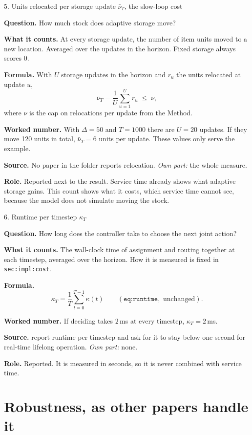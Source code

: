 \documentclass[11pt,a4paper]{article}
\newcommand{\row}[1]{\par\smallskip\noindent\textbf{#1}\enspace}
\begin{document}
\begin{card}{5. Units relocated per storage update $\bar\nu_T$, the slow-loop cost}
\row{Question.} How much stock does adaptive storage move?

\row{What it counts.} At every storage update, the number of item units
moved to a new location. Averaged over the updates in the horizon. Fixed
storage always scores $0$.

\row{Formula.} With $U$ storage updates in the horizon and $r_u$ the units
relocated at update $u$,
\[
  \bar\nu_T = \frac{1}{U}\sum_{u=1}^{U} r_u \;\le\; \nu ,
\]
where $\nu$ is the cap on relocations per update from the Method.

\row{Worked number.} With $\Delta = 50$ and $T = 1000$ there are $U = 20$
updates. If they move 120 units in total, $\bar\nu_T = 6$ units per
update. These values only serve the example.

\row{Source.} No paper in the folder reports relocation. \emph{Own part:}
the whole measure.

\row{Role.} Reported next to the result. Service time already shows what
adaptive storage gains. This count shows what it costs, which service time
cannot see, because the model does not simulate moving the stock.
\end{card}

\begin{card}{6. Runtime per timestep $\kappa_T$}
\row{Question.} How long does the controller take to choose the next joint
action?

\row{What it counts.} The wall-clock time of assignment and routing
together at each timestep, averaged over the horizon. How it is measured
is fixed in \texttt{sec:impl:cost}.

\row{Formula.}
\[
  \kappa_T = \frac{1}{T}\sum_{t=0}^{T-1}\kappa(t)
  \qquad (\texttt{eq:runtime}, \text{ unchanged}).
\]

\row{Worked number.} If deciding takes $2$\,ms at every timestep,
$\kappa_T = 2$\,ms.

\row{Source.} \citet{ma2017lifelong_mapf} report runtime per timestep and
ask for it to stay below one second for real-time lifelong operation.
\emph{Own part:} none.

\row{Role.} Reported. It is measured in seconds, so it is never combined
with service time.
\end{card}

\section{Robustness, as other papers handle it}
\label{sec:robust}
\end{document}
